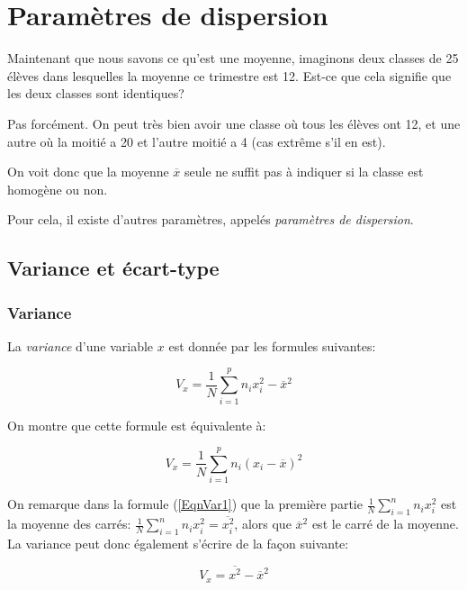 \documentclass[a4paper,12pt]{scrartcl}
\begin{document}
\section{Paramètres de dispersion}

Maintenant que nous savons ce qu'est une moyenne, imaginons deux classes de 25 élèves dans lesquelles la moyenne ce trimestre est 12. Est-ce que cela signifie que les deux classes sont identiques? 

Pas forcément. On peut très bien avoir une classe où tous les élèves ont 12, et une autre où la moitié a 20 et l'autre moitié a 4 (cas extrême s'il en est). 

On voit donc que la moyenne $\overline{x}$ seule ne suffit pas à indiquer si la classe est homogène ou non. 

Pour cela, il existe d'autres paramètres, appelés \emph{paramètres de dispersion}.

\subsection{Variance et écart-type}

\subsubsection{Variance}

La \emph{variance} d'une variable $x$ est donnée par les formules suivantes:

\begin{equation}
\label{EqnVar1}
V_x = \frac{1}{N} \sum_{i=1}^{p}n_i x_i^2 - \overline{x}^2
\end{equation}

On montre que cette formule est équivalente à:

\begin{equation}
\label{EqnVar2}
V_x = \frac{1}{N} \sum_{i=1}^{p}n_i (x_i - \overline{x})^2
\end{equation}

On remarque dans la formule (\ref{EqnVar1}) que la première partie $\frac{1}{N} \sum_{i=1}^{n}n_i x_i^2$ est la moyenne des carrés: $\frac{1}{N} \sum_{i=1}^{n}n_i x_i^2 = \overline{x_i^2}$, alors que $\overline{x}^2$ est le carré de la moyenne. La variance peut donc également s'écrire de la façon suivante:

\begin{equation}
\label{EqnVarSimple}
V_x = \overline{x^2} - \overline{x}^2
\end{equation}
\end{document}
